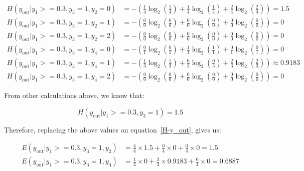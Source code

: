 \documentclass[12pt]{article}
\begin{document}
\begin{enumerate}[leftmargin=\labelsep]
\[
    \begin{aligned}
    H(y_{\text{out}} | y_1 >= 0.3 , y_3 = 1, y_2 = 0) & = - \left(\frac{1}{4} \log_2\left(\frac{1}{4}\right) + \frac{1}{4} \log_2\left(\frac{1}{4}\right)
    + \frac{2}{4} \log_2\left(\frac{2}{4}\right)\right) = 1.5                                                                       \\
    H(y_{\text{out}} | y_1 >= 0.3 , y_3 = 1, y_2 = 1) & = - \left(\frac{0}{0} \log_2\left(\frac{0}{0}\right) + \frac{0}{0} \log_2\left(\frac{0}{0}\right)
    + \frac{0}{0} \log_2\left(\frac{0}{0}\right)\right) = 0                                                                     \\
    H(y_{\text{out}} | y_1 >= 0.3 , y_3 = 1, y_2 = 2) & = - \left(\frac{0}{0} \log_2\left(\frac{0}{0}\right) + \frac{0}{0} \log_2\left(\frac{0}{0}\right)
    + \frac{0}{0} \log_2\left(\frac{0}{0}\right)\right) = 0                                                                       \\
    H(y_{\text{out}} | y_1 >= 0.3 , y_3 = 1, y_4 = 0) & = - \left(\frac{0}{1} \log_2\left(\frac{0}{1}\right) + \frac{1}{1} \log_2\left(\frac{1}{1}\right)
    + \frac{0}{1} \log_2\left(\frac{0}{1}\right)\right) = 0                                                                       \\
    H(y_{\text{out}} | y_1 >= 0.3 , y_3 = 1, y_4 = 1) & = - \left(\frac{1}{3} \log_2\left(\frac{1}{3}\right) + \frac{0}{3} \log_2\left(\frac{0}{3}\right)
    + \frac{2}{3} \log_2\left(\frac{2}{3}\right)\right) \approx 0.9183                                                                      \\
    H(y_{\text{out}} | y_1 >= 0.3 , y_3 = 1, y_4 = 2) & = - \left(\frac{0}{0} \log_2\left(\frac{0}{0}\right) + \frac{0}{0} \log_2\left(\frac{0}{0}\right)
    + \frac{0}{0} \log_2\left(\frac{0}{0}\right)\right) = 0 
    \end{aligned}
    \]

    From other calculations above, we know that:

    \[
        H(y_{\text{out}} | y_1 >= 0.3 , y_3 = 1) = 1.5
    \]

    Therefore, replacing the above values on equation~\eqref{H-y_out}, gives us:

    \[
        \begin{aligned}
        E(y_{\text{out}} | y_1 >= 0.3, y_3 = 1, y_2) & = \frac{4}{4} \times 1.5 + \frac{0}{4} \times 0 + \frac{0}{4} \times 0 = 1.5  \\
        E(y_{\text{out}} | y_1 >= 0.3, y_3 = 1, y_4) & = \frac{1}{4} \times 0 + \frac{3}{4} \times 0.9183 + \frac{0}{4} \times 0 = 0.6887
        \end{aligned}
    \]


\end{enumerate}
\end{document}
